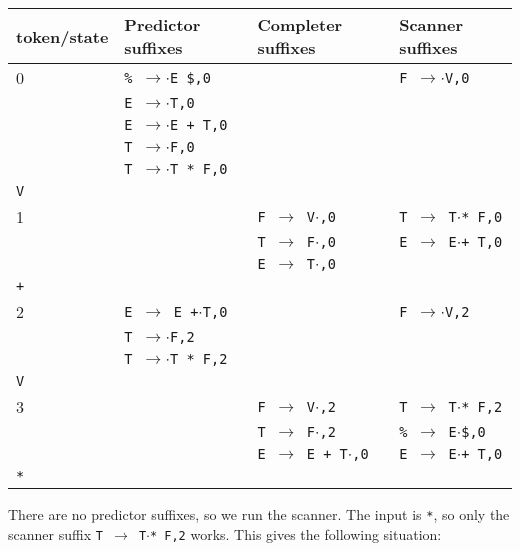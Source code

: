 \documentclass[11pt]{article}
\def\ra{\rightarrow}
\begin{document}
\begin{tabular}{|l|l|l|l|}
\hline
token/state & Predictor suffixes & Completer suffixes & Scanner suffixes\\
\hline
0     & \texttt{\% $\ra$$\cdot$E \$,0} & & \texttt{F $\ra$$\cdot$V,0}\\
      & \texttt{E $\ra$$\cdot$T,0} & & \\
      & \texttt{E $\ra$$\cdot$E + T,0} & & \\
      & \texttt{T $\ra$$\cdot$F,0} & & \\
      & \texttt{T $\ra$$\cdot$T * F,0} & & \\
\hline
\texttt{V} &  & &\\
\hline
1     &  & \texttt{F $\ra$ V$\cdot$,0}& \texttt{T $\ra$ T$\cdot$* F,0} \\
      &  & \texttt{T $\ra$ F$\cdot$,0}& \texttt{E $\ra$ E$\cdot$+ T,0} \\
      &  & \texttt{E $\ra$ T$\cdot$,0}& \\
\hline
\texttt{+} &  & &\\
\hline
2     & \texttt{E $\ra$ E +$\cdot$T,0} & & \texttt{F $\ra$$\cdot$V,2}\\
      & \texttt{T $\ra$$\cdot$F,2} & & \\
      & \texttt{T $\ra$$\cdot$T * F,2} & & \\
\hline 
\texttt{V} & & &\\
\hline
3     &  &  \texttt{F $\ra$ V$\cdot$,2}& \texttt{T $\ra$ T$\cdot$* F,2}\\
      &  &  \texttt{T $\ra$ F$\cdot$,2}& \texttt{\% $\ra$ E$\cdot$\$,0}\\
      &  &  \texttt{E $\ra$ E + T$\cdot$,0}& \texttt{E $\ra$ E$\cdot$+ T,0}\\
\hline
\texttt{*} & & & \\
\hline
\end{tabular}

There are no predictor suffixes, so we run the scanner.  The input is
\texttt{*}, so only the scanner suffix \texttt{T $\ra$ T$\cdot$* F,2}
works.  This gives the following situation:
\end{document}
